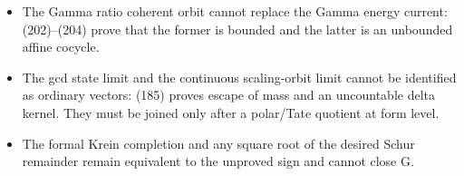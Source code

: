 \documentclass[11pt]{article}
\begin{document}
\begin{itemize}
      (177) is impossible on every nonzero compact-window source by (180),
      including on the primitive Tate subspace.
\item The Gamma ratio coherent orbit cannot replace the Gamma energy current:
      (202)--(204) prove that the former is bounded and the latter is an
      unbounded affine cocycle.
\item The gcd state limit and the continuous scaling-orbit limit cannot be
      identified as ordinary vectors: (185) proves escape of mass and an
      uncountable delta kernel.  They must be joined only after a polar/Tate
      quotient at form level.
\item The formal Krein completion and any square root of the desired Schur
      remainder remain equivalent to the unproved sign and cannot close G.
\end{itemize}
\end{document}
